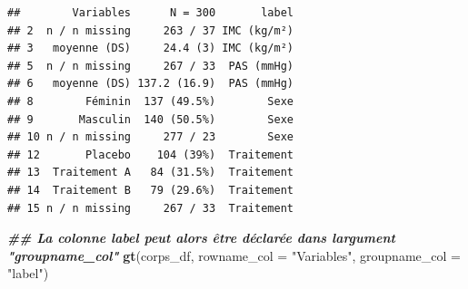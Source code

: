\documentclass[
]{book}
\newenvironment{Shaded}{\begin{snugshade}}{\end{snugshade}}
\newcommand{\AttributeTok}[1]{\textcolor[rgb]{0.13,0.29,0.53}{#1}}
\newcommand{\DecValTok}[1]{\textcolor[rgb]{0.00,0.00,0.81}{#1}}
\newcommand{\DocumentationTok}[1]{\textcolor[rgb]{0.56,0.35,0.01}{\textbf{\textit{#1}}}}
\newcommand{\FunctionTok}[1]{\textcolor[rgb]{0.13,0.29,0.53}{\textbf{#1}}}
\newcommand{\NormalTok}[1]{#1}
\newcommand{\OtherTok}[1]{\textcolor[rgb]{0.56,0.35,0.01}{#1}}
\newcommand{\SpecialCharTok}[1]{\textcolor[rgb]{0.81,0.36,0.00}{\textbf{#1}}}
\newcommand{\StringTok}[1]{\textcolor[rgb]{0.31,0.60,0.02}{#1}}
\begin{document}
\begin{Shaded}
\end{Shaded}

\begin{verbatim}
##        Variables      N = 300       label
## 2  n / n missing     263 / 37 IMC (kg/m²)
## 3   moyenne (DS)     24.4 (3) IMC (kg/m²)
## 5  n / n missing     267 / 33  PAS (mmHg)
## 6   moyenne (DS) 137.2 (16.9)  PAS (mmHg)
## 8        Féminin  137 (49.5%)        Sexe
## 9       Masculin  140 (50.5%)        Sexe
## 10 n / n missing     277 / 23        Sexe
## 12       Placebo    104 (39%)  Traitement
## 13  Traitement A   84 (31.5%)  Traitement
## 14  Traitement B   79 (29.6%)  Traitement
## 15 n / n missing     267 / 33  Traitement
\end{verbatim}

\begin{Shaded}
\begin{Highlighting}[]
\DocumentationTok{\#\# La colonne label peut alors être déclarée dans l\textquotesingle{}argument "groupname\_col"}
\FunctionTok{gt}\NormalTok{(corps\_df, }
   \AttributeTok{rowname\_col =} \StringTok{"Variables"}\NormalTok{, }
   \AttributeTok{groupname\_col =} \StringTok{"label"}\NormalTok{) }
\end{Highlighting}
\end{Shaded}
\end{document}
